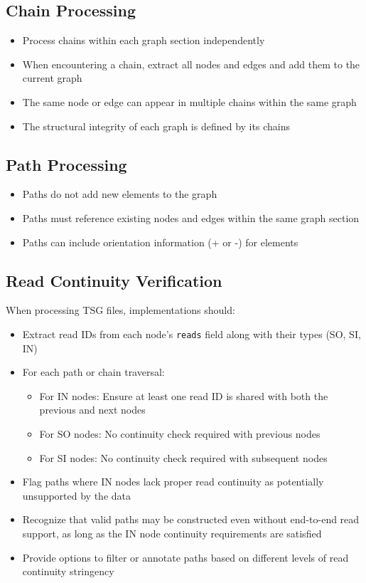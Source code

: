 \documentclass{article}
\begin{document}
\subsection{Chain Processing}

\begin{itemize}
	\item Process chains within each graph section independently
	\item When encountering a chain, extract all nodes and edges and add them to the current graph
	\item The same node or edge can appear in multiple chains within the same graph
	\item The structural integrity of each graph is defined by its chains
\end{itemize}

\subsection{Path Processing}

\begin{itemize}
	\item Paths do not add new elements to the graph
	\item Paths must reference existing nodes and edges within the same graph section
	\item Paths can include orientation information (+ or -) for elements
\end{itemize}

\subsection{Read Continuity Verification}

When processing TSG files, implementations should:

\begin{itemize}
	\item Extract read IDs from each node's \texttt{reads} field along with their types (SO, SI, IN)
	\item For each path or chain traversal:
	      \begin{itemize}
		      \item For IN nodes: Ensure at least one read ID is shared with both the previous and next nodes
		      \item For SO nodes: No continuity check required with previous nodes
		      \item For SI nodes: No continuity check required with subsequent nodes
	      \end{itemize}
	\item Flag paths where IN nodes lack proper read continuity as potentially unsupported by the data
	\item Recognize that valid paths may be constructed even without end-to-end read support, as long as the IN node continuity requirements are satisfied
	\item Provide options to filter or annotate paths based on different levels of read continuity stringency
\end{itemize}
\end{document}

